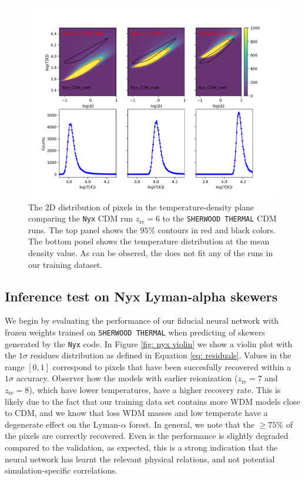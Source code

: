 \begin{figure}
    \centering
    \includegraphics[width=0.99\linewidth]{img/ML/TD_plane_nyx_sher.png}
    \caption{The 2D distribution of pixels in the temperature-density plane comparing the \texttt{Nyx} CDM run $z_\mathrm{re}=6$ to the \texttt{SHERWOOD THERMAL} CDM runs. The top panel shows the $95\%$ contours in red and black colors. The bottom ponel shows the temperature distribution at the mean density value. As can be obsered, the  does not fit any of the runs in our training dataset.}
    \label{fig: nyx TD}
\end{figure}

\subsection{Inference test on Nyx Lyman-alpha skewers}
We begin by evaluating the performance of our fiducial neural network with frozen weights trained on \texttt{SHERWOOD THERMAL} when predicting of skewers generated by the \texttt{Nyx} code. In Figure \ref{fig: nyx violin} we show a violin plot with the $1\sigma$ residues distribution as defined in Equation \ref{eq: residuals}. Values in the range $[0,1]$ correspond to pixels that have been succesfully recovered within a $1\sigma$ accuracy. Observer how the models with earlier reionization ($z_\mathrm{re}=7$ and $z_\mathrm{re}=8$), which have lower temperatures, have a higher recovery rate. This is likely due to the fact that our training data set contains more WDM models close to CDM, and we know that loss WDM masses and low temperate have a degenerate effect on the Lyman-$\alpha$ forest. In general, we note that the $\geq 75 \%$ of the pixels are correctly recovered. Even is the performance is slightly degraded compared to the  validation, as expected, this is a strong indication that the neural network has learnt the relevant physical relations, and not potential simulation-specific correlations.

